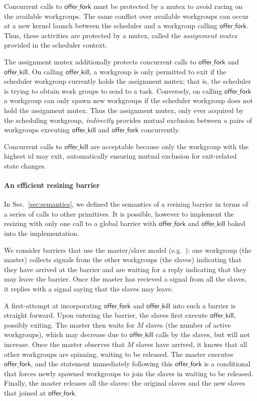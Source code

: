 \documentclass[numbers,nocopyrightspace,10pt]{sigplanconf}
\newcommand{\mysec}{Sec.~}
\newcommand{\offerfork}{\mathsf{offer\_fork}}
\newcommand{\offerkill}{\mathsf{offer\_kill}}
\begin{document}
Concurrent calls to $\offerfork$ must be protected by a mutex to avoid
racing on the available workgroups. The same conflict over available
workgroups can occur at a new kernel launch between the scheduler and
a workgroup calling $\offerfork$. Thus, these activities are protected
by a mutex, called the \emph{assignment mutex} provided in the scheduler
context.

The assignment mutex additionally protects concurrent calls to
$\offerfork$ and $\offerkill$.  On calling $\offerkill$, a workgroup
is only permitted to exit if the scheduler workgroup currently holds
the assignment mutex; that is, the scheduler is trying to obtain work
groups to send to a task.  Conversely, on calling $\offerfork$ a
workgroup can only spawn new workgroups if the scheduler workgroup
does not hold the assignment mutex.  Thus the assignment mutex, only
ever acquired by the scheduling workgroup, \emph{indirectly} provides
mutual exclusion between a pairs of workgroups executing $\offerkill$
and $\offerfork$ concurrently.

Concurrent calls to $\offerkill$ are acceptable because only the
workgroup with the highest id may exit, automatically ensuring mutual
exclusion for exit-related state changes.

\paragraph{An efficient resizing barrier}

In \mysec\ref{sec:semantics}, we defined the semantics of a resizing barrier in terms
of a series of calls to other primitives.  It is possible, however to implement the resizing with
only one call to a global barrier with $\offerfork$ and $\offerkill$
baked into the implementation. 

We consider barriers that use the master/slave model
(e.g.\ \cite{XF10}): one workgroup (the master) collects signals
from the other workgroups (the slaves) indicating that they have
arrived at the barrier and are waiting for a reply indicating that
they may leave the barrier. Once the master has recieved a signal from
all the slaves, it replies with a signal saying that the slaves may
leave. 

A first-attempt at incorporating $\offerfork$ and $\offerkill$ into
such a barrier is straight forward. Upon entering the barrier, the
slaves first execute $\offerkill$, possibly exiting. The master then
waits for $M$ slaves (the number of active workgroups), which may
decrease due to $\offerkill$ calls by the
slaves, but will not increase. Once the master observes that $M$ slaves
have arrived, it knows that all other workgroups are spinning, waiting to be released. The master executes $\offerfork$,
and the statement immediately following this $\offerfork$ is a conditional that forces newly spawned workgroups to join the
slaves in waiting to be released. Finally, the master
releases all the slaves: the original slaves and the new slaves that
joined at $\offerfork$.
\end{document}
